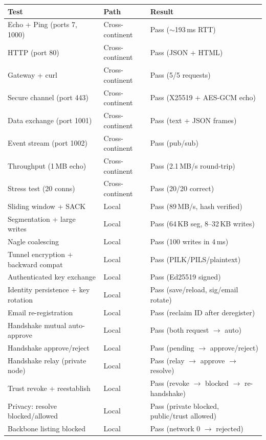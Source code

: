 \documentclass[11pt,a4paper]{article}
\begin{document}
\begin{table}[h]
\centering
\small
\begin{tabular}{@{}lll@{}}
\toprule
\textbf{Test} & \textbf{Path} & \textbf{Result} \\
\midrule
Echo + Ping (ports 7, 1000) & Cross-continent & Pass (${\sim}$193\,ms RTT) \\
HTTP (port 80) & Cross-continent & Pass (JSON + HTML) \\
Gateway + curl & Cross-continent & Pass (5/5 requests) \\
Secure channel (port 443) & Cross-continent & Pass (X25519 + AES-GCM echo) \\
Data exchange (port 1001) & Cross-continent & Pass (text + JSON frames) \\
Event stream (port 1002) & Cross-continent & Pass (pub/sub) \\
Throughput (1\,MB echo) & Cross-continent & Pass (2.1\,MB/s round-trip) \\
Stress test (20 conns) & Cross-continent & Pass (20/20 correct) \\
\midrule
Sliding window + SACK & Local & Pass (89\,MB/s, hash verified) \\
Segmentation + large writes & Local & Pass (64\,KB seg, 8--32\,KB writes) \\
Nagle coalescing & Local & Pass (100 writes in 4\,ms) \\
Tunnel encryption + backward compat & Local & Pass (PILK/PILS/plaintext) \\
Authenticated key exchange & Local & Pass (Ed25519 signed) \\
Identity persistence + key rotation & Local & Pass (save/reload, sig/email rotate) \\
Email re-registration & Local & Pass (reclaim ID after deregister) \\
\midrule
Handshake mutual auto-approve & Local & Pass (both request $\rightarrow$ auto) \\
Handshake approve/reject & Local & Pass (pending $\rightarrow$ approve/reject) \\
Handshake relay (private node) & Local & Pass (relay $\rightarrow$ approve $\rightarrow$ resolve) \\
Trust revoke + reestablish & Local & Pass (revoke $\rightarrow$ blocked $\rightarrow$ re-handshake) \\
Privacy: resolve blocked/allowed & Local & Pass (private blocked, public/trust allowed) \\
Backbone listing blocked & Local & Pass (network 0 $\rightarrow$ rejected) \\

\end{tabular}
\end{table}
\end{document}
